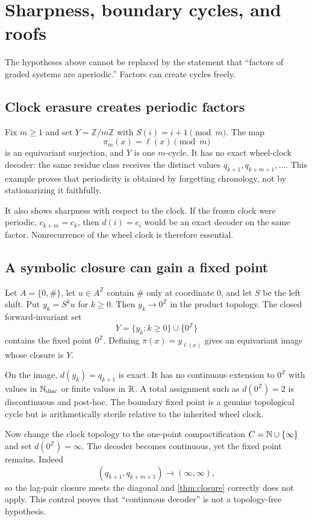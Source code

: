 \section{Sharpness, boundary cycles, and roofs}
\label{sec:sharpness}

The hypotheses above cannot be replaced by the statement that ``factors of
graded systems are aperiodic.''  Factors can create cycles freely.

\subsection{Clock erasure creates periodic factors}

Fix $m\ge1$ and set $Y=\mathbb Z/m\mathbb Z$ with
$S(i)=i+1\pmod m$.  The map
\[
\pi_m(x)=\ell(x)\pmod m
\]
is an equivariant surjection, and $Y$ is one $m$-cycle.  It has no exact
wheel-clock decoder: the same residue class receives the distinct values
$q_{k+1},q_{k+m+1},\ldots$.  This example proves that periodicity is obtained
by forgetting chronology, not by stationarizing it faithfully.

It also shows sharpness with respect to the clock.  If the frozen clock were
periodic, $c_{k+m}=c_k$, then $d(i)=c_i$ would be an exact decoder on the
same factor.  Nonrecurrence of the wheel clock is therefore essential.

\subsection{A symbolic closure can gain a fixed point}

Let $A=\{0,\#\}$, let $u\in A^{\mathbb Z}$ contain $\#$ only at coordinate
$0$, and let $S$ be the left shift.  Put $y_k=S^ku$ for $k\ge0$.  Then
$y_k\to 0^{\mathbb Z}$ in the product topology.  The closed forward-invariant set
\[
Y=\{y_k:k\ge0\}\cup\{0^{\mathbb Z}\}
\]
contains the fixed point $0^{\mathbb Z}$.  Defining
$\pi(x)=y_{\ell(x)}$ gives an equivariant image whose closure is $Y$.

On the image, $d(y_k)=q_{k+1}$ is exact.  It has no continuous extension to
$0^{\mathbb Z}$ with values in $\mathbb{N}_{\mathrm{disc}}$ or finite values in
$\mathbb{R}$.  A total assignment such as $d(0^{\mathbb Z})=2$ is discontinuous and
post-hoc.  The boundary fixed point is a genuine topological cycle but is
arithmetically sterile relative to the inherited wheel clock.

Now change the clock topology to the one-point compactification
$C=\mathbb{N}\cup\{\infty\}$ and set $d(0^{\mathbb Z})=\infty$.  The decoder becomes
continuous, yet the fixed point remains.  Indeed
\[
(q_{k+1},q_{k+m+1})\longrightarrow(\infty,\infty),
\]
so the lag-pair closure meets the diagonal and
\cref{thm:closure} correctly does not apply.  This control proves that
``continuous decoder'' is not a topology-free hypothesis.

